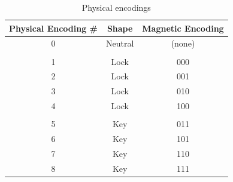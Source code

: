\documentclass[runningheads]{llncs}
\begin{document}
\begin{table}
\caption{ Physical encodings}
\vspace{2pt}
\begin{center}
\begin{tabular}{c@{\quad}cc}
\hline
Physical Encoding \# & Shape & Magnetic Encoding \\
\hline\rule{0pt}{12pt}
0	& \index{neutral}Neutral	& (none) \\
\\
1 	& \index{lock}Lock		& 000 \\
2 	& \index{lock}Lock		& 001 \\
3	& \index{lock}Lock		& 010 \\
4	& \index{lock}Lock		& 100 \\
\\
5	& \index{key}Key		& 011 \\
6	& \index{key}Key		& 101 \\
7	& \index{key}Key		& 110 \\
8	& \index{key}Key		& 111 \\
\hline
\end{tabular}
\end{center}
\end{table}



\end{document}
